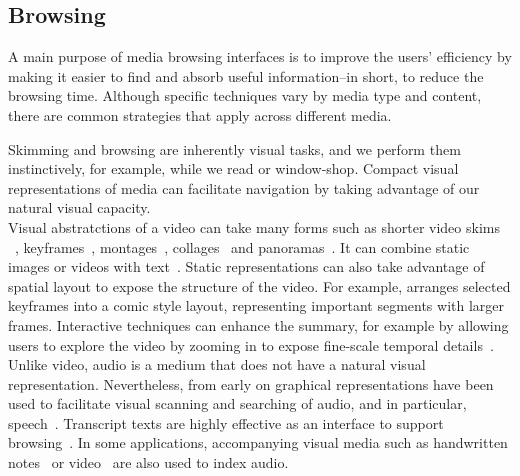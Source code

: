 \subsection{Browsing}
A main purpose of media browsing interfaces is to improve the users' efficiency by making it easier to find and absorb useful information--in short, to reduce the browsing time. Although specific techniques vary by media type and content, there are common strategies that apply across different media. 
%
\begin{mldescription}
 Skimming and browsing are inherently visual tasks, and we perform them instinctively, for example, while we read or window-shop. Compact visual representations of media can facilitate navigation by taking advantage of our natural visual capacity. \\
Visual abstratctions of a video can take many forms such as shorter video skims ~\cite{chu2015video,lu2013story}, keyframes~\cite{kim2014joint,khosla2013large}, montages~\cite{sun2014salient}, collages~\cite{wang2007video} and panoramas~\cite{liu2008discovering,choudary2007summarization}. It can combine static images or videos with text~\cite{papernick2005summarization}. Static representations can also take advantage of spatial layout to expose the structure of the video. For example, \cite{boreczky2000interactive} arranges selected keyframes into a comic style layout, representing important segments with larger frames. Interactive techniques can enhance the summary, for example by allowing users to explore the video by zooming in to expose fine-scale temporal details~\cite{barnes2010video}.\\
Unlike video, audio is a medium that does not have a natural visual representation. Nevertheless, from early on graphical representations have been used to facilitate visual scanning and searching of audio, and in particular, speech~\cite{schmandt1981intelligent,degen1992working}. Transcript texts are highly effective as an interface to support browsing~\cite{schmandt1981intelligent,whittaker1999scan}. In some applications, accompanying visual media such as handwritten notes~\cite{whittaker1994filochat,stifelman2001audio} or video~\cite{kazman1996four,hauptmann1997informedia} are also used to index audio.\\  


\end{mldescription}
